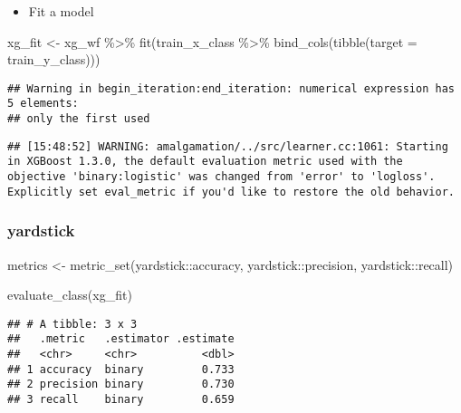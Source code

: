 \documentclass[
]{book}
\newenvironment{Shaded}{\begin{snugshade}}{\end{snugshade}}
\newcommand{\AttributeTok}[1]{\textcolor[rgb]{0.77,0.63,0.00}{#1}}
\newcommand{\FunctionTok}[1]{\textcolor[rgb]{0.00,0.00,0.00}{#1}}
\newcommand{\NormalTok}[1]{#1}
\newcommand{\OtherTok}[1]{\textcolor[rgb]{0.56,0.35,0.01}{#1}}
\newcommand{\SpecialCharTok}[1]{\textcolor[rgb]{0.00,0.00,0.00}{#1}}
\providecommand{\tightlist}{%
  \setlength{\itemsep}{0pt}\setlength{\parskip}{0pt}}
\begin{document}
\begin{itemize}
\tightlist
\item
  Fit a model
\end{itemize}

\begin{Shaded}
\begin{Highlighting}[]
\NormalTok{xg\_fit }\OtherTok{\textless{}{-}}\NormalTok{ xg\_wf }\SpecialCharTok{\%\textgreater{}\%} \FunctionTok{fit}\NormalTok{(train\_x\_class }\SpecialCharTok{\%\textgreater{}\%} \FunctionTok{bind\_cols}\NormalTok{(}\FunctionTok{tibble}\NormalTok{(}\AttributeTok{target =}\NormalTok{ train\_y\_class)))}
\end{Highlighting}
\end{Shaded}

\begin{verbatim}
## Warning in begin_iteration:end_iteration: numerical expression has 5 elements:
## only the first used
\end{verbatim}

\begin{verbatim}
## [15:48:52] WARNING: amalgamation/../src/learner.cc:1061: Starting in XGBoost 1.3.0, the default evaluation metric used with the objective 'binary:logistic' was changed from 'error' to 'logloss'. Explicitly set eval_metric if you'd like to restore the old behavior.
\end{verbatim}

\hypertarget{yardstick-3}{%
\subsubsection{yardstick}\label{yardstick-3}}

\begin{Shaded}
\begin{Highlighting}[]
\NormalTok{metrics }\OtherTok{\textless{}{-}} \FunctionTok{metric\_set}\NormalTok{(yardstick}\SpecialCharTok{::}\NormalTok{accuracy, }
\NormalTok{                      yardstick}\SpecialCharTok{::}\NormalTok{precision, }
\NormalTok{                      yardstick}\SpecialCharTok{::}\NormalTok{recall)}

\FunctionTok{evaluate\_class}\NormalTok{(xg\_fit)}
\end{Highlighting}
\end{Shaded}

\begin{verbatim}
## # A tibble: 3 x 3
##   .metric   .estimator .estimate
##   <chr>     <chr>          <dbl>
## 1 accuracy  binary         0.733
## 2 precision binary         0.730
## 3 recall    binary         0.659
\end{verbatim}
\end{document}

